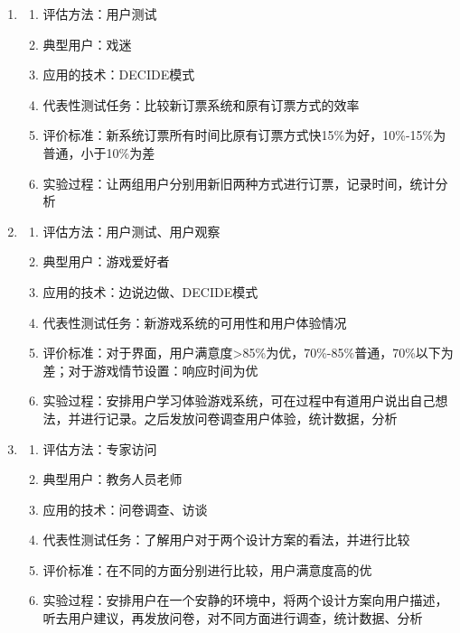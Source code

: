 \begin{solution}
\begin{enumerate}[label=\alph*.]
    \item 
    \begin{enumerate}[label=\arabic*.]
        \item 评估方法：用户测试
        \item 典型用户：戏迷
        \item 应用的技术：DECIDE模式
        \item 代表性测试任务：比较新订票系统和原有订票方式的效率
        \item 评价标准：新系统订票所有时间比原有订票方式快15\%为好，10\%-15\%为普通，小于10\%为差
        \item 实验过程：让两组用户分别用新旧两种方式进行订票，记录时间，统计分析
    \end{enumerate}
    \item 
    \begin{enumerate}[label=\arabic*.]
        \item 评估方法：用户测试、用户观察
        \item 典型用户：游戏爱好者
        \item 应用的技术：边说边做、DECIDE模式
        \item 代表性测试任务：新游戏系统的可用性和用户体验情况
        \item 评价标准：对于界面，用户满意度>85\%为优，70\%-85\%普通，70\%以下为差；对于游戏情节设置：响应时间为优
        \item 实验过程：安排用户学习体验游戏系统，可在过程中有道用户说出自己想法，并进行记录。之后发放问卷调查用户体验，统计数据，分析
    \end{enumerate}
    \item 
    \begin{enumerate}[label=\arabic*.]
        \item 评估方法：专家访问
        \item 典型用户：教务人员老师
        \item 应用的技术：问卷调查、访谈
        \item 代表性测试任务：了解用户对于两个设计方案的看法，并进行比较
        \item 评价标准：在不同的方面分别进行比较，用户满意度高的优
        \item 实验过程：安排用户在一个安静的环境中，将两个设计方案向用户描述，听去用户建议，再发放问卷，对不同方面进行调查，统计数据、分析
    \end{enumerate}
\end{enumerate}
\end{solution}




